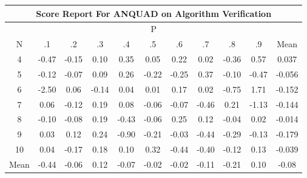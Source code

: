 \documentclass[11pt,a4paper]{report}
\begin{document}
\begin{longtable}{ | c || c | c | c | c | c | c | c | c | c || c |}
\hline
\multicolumn{11}{|c|}{ Score Report For ANQUAD on Algorithm Verification} \\
\hline
\multicolumn{11}{|c|}{ P } \\
\hline
N & .1 & .2 & .3 & .4 & .5 & .6 & .7 & .8 & .9 & Mean\\
 \hline
 \hline
 \endhead
  4 &  \cellcolor[HTML]{FFF7F7} -0.47 &  \cellcolor[HTML]{FFFFFF} -0.15 &  \cellcolor[HTML]{FFFFFF} 0.10 &  \cellcolor[HTML]{F7F7FF} 0.35 &  \cellcolor[HTML]{FFFFFF} 0.05 &  \cellcolor[HTML]{F7F7FF} 0.22 &  \cellcolor[HTML]{FFFFFF} 0.02 &  \cellcolor[HTML]{FFF7F7} -0.36 &  \cellcolor[HTML]{EFEFFF} 0.57 & 0.037 \\
  5 &  \cellcolor[HTML]{FFFFFF} -0.12 &  \cellcolor[HTML]{FFFFFF} -0.07 &  \cellcolor[HTML]{FFFFFF} 0.09 &  \cellcolor[HTML]{F7F7FF} 0.26 &  \cellcolor[HTML]{FFF7F7} -0.22 &  \cellcolor[HTML]{FFF7F7} -0.25 &  \cellcolor[HTML]{F7F7FF} 0.37 &  \cellcolor[HTML]{FFFFFF} -0.10 &  \cellcolor[HTML]{FFF7F7} -0.47 & -0.056 \\
  6 &  \cellcolor[HTML]{FFBFBF} -2.50 &  \cellcolor[HTML]{FFFFFF} 0.06 &  \cellcolor[HTML]{FFFFFF} -0.14 &  \cellcolor[HTML]{FFFFFF} 0.04 &  \cellcolor[HTML]{FFFFFF} 0.01 &  \cellcolor[HTML]{F7F7FF} 0.17 &  \cellcolor[HTML]{FFFFFF} 0.02 &  \cellcolor[HTML]{FFEFEF} -0.75 &  \cellcolor[HTML]{D7D7FF} 1.71 & -0.152 \\
  7 &  \cellcolor[HTML]{FFFFFF} 0.06 &  \cellcolor[HTML]{FFFFFF} -0.12 &  \cellcolor[HTML]{F7F7FF} 0.19 &  \cellcolor[HTML]{FFFFFF} 0.08 &  \cellcolor[HTML]{FFFFFF} -0.06 &  \cellcolor[HTML]{FFFFFF} -0.07 &  \cellcolor[HTML]{FFF7F7} -0.46 &  \cellcolor[HTML]{F7F7FF} 0.21 &  \cellcolor[HTML]{FFDFDF} -1.13 & -0.144 \\
  8 &  \cellcolor[HTML]{FFFFFF} -0.10 &  \cellcolor[HTML]{FFFFFF} -0.08 &  \cellcolor[HTML]{F7F7FF} 0.19 &  \cellcolor[HTML]{FFF7F7} -0.43 &  \cellcolor[HTML]{FFFFFF} -0.06 &  \cellcolor[HTML]{F7F7FF} 0.25 &  \cellcolor[HTML]{FFFFFF} 0.12 &  \cellcolor[HTML]{FFFFFF} -0.04 &  \cellcolor[HTML]{FFFFFF} 0.02 & -0.014 \\
  9 &  \cellcolor[HTML]{FFFFFF} 0.03 &  \cellcolor[HTML]{FFFFFF} 0.12 &  \cellcolor[HTML]{F7F7FF} 0.24 &  \cellcolor[HTML]{FFE7E7} -0.90 &  \cellcolor[HTML]{FFF7F7} -0.21 &  \cellcolor[HTML]{FFFFFF} -0.03 &  \cellcolor[HTML]{FFF7F7} -0.44 &  \cellcolor[HTML]{FFF7F7} -0.29 &  \cellcolor[HTML]{FFFFFF} -0.13 & -0.179 \\
  10 &  \cellcolor[HTML]{FFFFFF} 0.04 &  \cellcolor[HTML]{FFF7F7} -0.17 &  \cellcolor[HTML]{F7F7FF} 0.18 &  \cellcolor[HTML]{FFFFFF} 0.10 &  \cellcolor[HTML]{F7F7FF} 0.32 &  \cellcolor[HTML]{FFF7F7} -0.44 &  \cellcolor[HTML]{FFF7F7} -0.40 &  \cellcolor[HTML]{FFFFFF} -0.12 &  \cellcolor[HTML]{FFFFFF} 0.13 & -0.039 \\
 \hline
 \hline
Mean &  \cellcolor[HTML]{FFF7F7} -0.44 &  \cellcolor[HTML]{FFFFFF} -0.06 &  \cellcolor[HTML]{FFFFFF} 0.12 &  \cellcolor[HTML]{FFFFFF} -0.07 &  \cellcolor[HTML]{FFFFFF} -0.02 &  \cellcolor[HTML]{FFFFFF} -0.02 &  \cellcolor[HTML]{FFFFFF} -0.11 &  \cellcolor[HTML]{FFF7F7} -0.21 &  \cellcolor[HTML]{FFFFFF} 0.10 &  \cellcolor[HTML]{FFFFFF} -0.08
\end{longtable}
\end{document}
